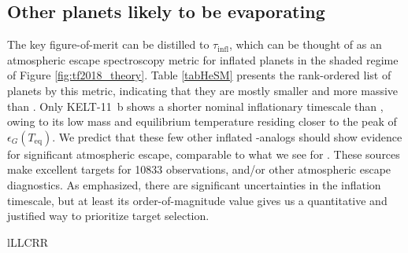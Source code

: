 \documentclass[linenumbers, twocolumn, trackchanges]{aastex631}
\newcommand{\hatpb}{\object{HAT-P-67 b}}
\begin{document}
\subsection{Other planets likely to be evaporating}

The key figure-of-merit can be distilled to $\tau_\mathrm{infl}$, which can be thought of as an atmospheric escape spectroscopy metric \citep{2018PASP..130k4401K} for inflated planets in the shaded regime of Figure \ref{fig:tf2018_theory}.    Table \ref{tabHeSM} presents the rank-ordered list of planets by this metric, indicating that they are mostly smaller and more massive than \hatpb.  Only KELT-11~b shows a shorter nominal inflationary timescale than \hatpb, owing to its low mass and equilibrium temperature residing closer to the peak of $\epsilon_G(T_\mathrm{eq})$.  We predict that these few other inflated \hatpb-analogs should show evidence for significant atmospheric escape, comparable to what we see for \hatpb.  These sources make excellent targets for  10833 observations, and/or other atmospheric escape diagnostics.  As emphasized, there are significant uncertainties in the inflation timescale, but at least its order-of-magnitude value gives us a quantitative and justified way to prioritize target selection.

\begin{deluxetable*}{lLLCRR}
  \tablewidth{0pc}
  \startdata
  
  \enddata
\end{deluxetable*}
\end{document}
